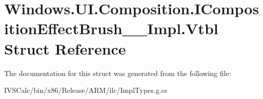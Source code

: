 \hypertarget{struct_windows_1_1_u_i_1_1_composition_1_1_i_composition_effect_brush_____impl_1_1_vtbl}{}\section{Windows.\+U\+I.\+Composition.\+I\+Composition\+Effect\+Brush\+\_\+\+\_\+\+Impl.\+Vtbl Struct Reference}
\label{struct_windows_1_1_u_i_1_1_composition_1_1_i_composition_effect_brush_____impl_1_1_vtbl}


The documentation for this struct was generated from the following file\+:\begin{DoxyCompactItemize}
\item 
I\+V\+S\+Calc/bin/x86/\+Release/\+A\+R\+M/ilc/Impl\+Types.\+g.\+cs\end{DoxyCompactItemize}

